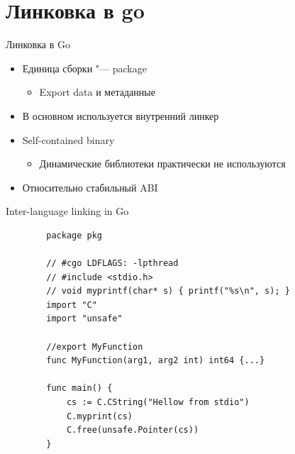 \documentclass{beamer}
\begin{document}
\section{Линковка в go}

\begin{frame}{Линковка в Go}
    \begin{itemize}
        \item Единица сборки "--- package
            \begin{itemize}
                \item Export data и метаданные
            \end{itemize}
        \item В основном используется внутренний линкер
        \item Self-contained binary
            \begin{itemize}
                \item Динамические библиотеки практически не используются
            \end{itemize}
        \item Относительно стабильный ABI
    \end{itemize}
\end{frame}

\begin{frame}[fragile]{Inter-language linking in Go}
    \begin{verbatim}
        package pkg

        // #cgo LDFLAGS: -lpthread
        // #include <stdio.h>
        // void myprintf(char* s) { printf("%s\n", s); }
        import "C"
        import "unsafe"

        //export MyFunction
        func MyFunction(arg1, arg2 int) int64 {...}

        func main() {
            cs := C.CString("Hellow from stdio")
            C.myprint(cs)
            C.free(unsafe.Pointer(cs))
        }
    \end{verbatim}
\end{frame}
\end{document}
